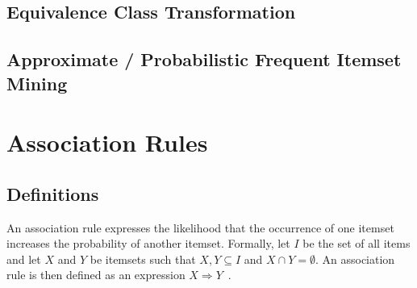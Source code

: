 

\subsection{Equivalence Class Transformation}

\subsection{Approximate / Probabilistic Frequent Itemset Mining}

\section{Association Rules}

\subsection{Definitions}

An association rule expresses the likelihood that the occurrence of one itemset increases the probability of another itemset. Formally, let $I$ be the set of all items and let $X$ and $Y$ be itemsets such that $X, Y \subseteq I$ and $X \cap Y = \emptyset$. An association rule is then defined as an expression $X \Rightarrow Y$~\parencite{agrawal1996fast}.

